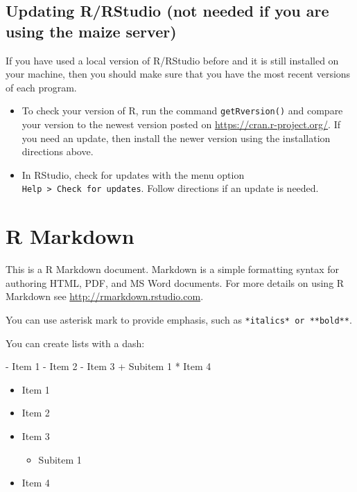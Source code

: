 \documentclass[
]{book}
\newenvironment{Shaded}{\begin{snugshade}}{\end{snugshade}}
\newcommand{\DecValTok}[1]{\textcolor[rgb]{0.00,0.00,0.81}{#1}}
\newcommand{\NormalTok}[1]{#1}
\newcommand{\SpecialCharTok}[1]{\textcolor[rgb]{0.00,0.00,0.00}{#1}}
\providecommand{\tightlist}{%
  \setlength{\itemsep}{0pt}\setlength{\parskip}{0pt}}
\begin{document}
\hypertarget{updating-rrstudio-not-needed-if-you-are-using-the-maize-server}{%
\section{Updating R/RStudio (not needed if you are using the maize server)}\label{updating-rrstudio-not-needed-if-you-are-using-the-maize-server}}

If you have used a local version of R/RStudio before and it is still installed on your machine, then you should make sure that you have the most recent versions of each program.

\begin{itemize}
\item
  To check your version of R, run the command \texttt{getRversion()} and compare your version to the newest version posted on \url{https://cran.r-project.org/}. If you need an update, then install the newer version using the installation directions above.
\item
  In RStudio, check for updates with the menu option \texttt{Help\ \textgreater{}\ Check\ for\ updates}. Follow directions if an update is needed.
\end{itemize}

\hypertarget{r-markdown}{%
\chapter{R Markdown}\label{r-markdown}}

This is a R Markdown document. Markdown is a simple formatting syntax for authoring HTML, PDF, and MS Word documents. For more details on using R Markdown see \url{http://rmarkdown.rstudio.com}.

You can use asterisk mark to provide emphasis, such as \texttt{*italics*\ or\ **bold**}.

You can create lists with a dash:

\begin{Shaded}
\begin{Highlighting}[]
\SpecialCharTok{{-}}\NormalTok{ Item }\DecValTok{1}
\SpecialCharTok{{-}}\NormalTok{ Item }\DecValTok{2}
\SpecialCharTok{{-}}\NormalTok{ Item }\DecValTok{3}
  \SpecialCharTok{+}\NormalTok{ Subitem }\DecValTok{1}
\SpecialCharTok{*}\NormalTok{ Item }\DecValTok{4}
\end{Highlighting}
\end{Shaded}

\begin{itemize}
\tightlist
\item
  Item 1
\item
  Item 2
\item
  Item 3

  \begin{itemize}
  \tightlist
  \item
    Subitem 1
  \end{itemize}
\item
  Item 4
\end{itemize}
\end{document}
